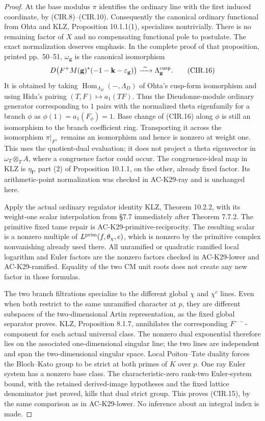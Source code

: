 \begin{proof}
At the base modulus \(\pi\) identifies the ordinary line
with the first induced coordinate, by (CIR.8)--(CIR.10).
Consequently the canonical ordinary functional from Ohta and
KLZ, Proposition 10.1.1(1), specializes nontrivially.  There is
no remaining factor of \(X\) and no compensating functional
pole to postulate.  The exact normalization deserves emphasis.
In the complete proof of that proposition, printed pp.~50--51,
\(\omega_{\mathbf g}\) is the canonical isomorphism
\[
 D\bigl(F^+M(\mathbf g)^*(-1-\mathbf k-\varepsilon_{\mathbf g})\bigr)
           \xrightarrow{\ \sim\ }\Lambda_{\mathbf g}^{\rm cusp}.
                                                               \tag{CIR.16}
\]
It is obtained by taking \(\operatorname{Hom}_{\Lambda_D}(-,\Lambda_D)\)
of Ohta's cusp-form isomorphism and using Hida's pairing
\((T,F)\mapsto a_1(TF)\).  Thus the Dieudonne-module ordinary
generator corresponding to \(1\) pairs with the normalized
theta eigenfamily for a branch \(\phi\) as
\(\phi(1)=a_1(F_\phi)=1\).
Base change of (CIR.16) along \(\phi\) is still an isomorphism
to the branch coefficient ring.  Transporting it across the
isomorphism \(\pi|_{F^+}\) remains an isomorphism and hence is
nonzero at weight one.  This uses the quotient-dual evaluation;
it does not project a theta eigenvector in
\(\omega_T\otimes_T A\), where a congruence factor could occur.
The congruence-ideal map in KLZ is \(\eta_{\mathbf f}\),
part (2) of Proposition 10.1.1, on the other, already fixed
factor.  Its arithmetic-point normalization was checked in
AC-K29-ray and is unchanged here.

Apply the actual ordinary regulator
identity KLZ, Theorem 10.2.2, with its weight-one scalar
interpolation from \S7.7 immediately after Theorem 7.7.2.
The primitive fixed tame repair is AC-K29-primitive-reciprocity.
The resulting scalar is a nonzero multiple of
\(L^{\rm prim}(f,\theta_\chi,e)\), which is nonzero by the
primitive complex nonvanishing already used there.  All
unramified or quadratic ramified local logarithm and Euler
factors are the nonzero factors checked in AC-K29-lower and
AC-K29-ramified.  Equality of the two CM unit roots does not
create any new factor in those formulas.

The two branch filtrations specialize to the different global
\(\chi\) and \(\chi^c\) lines.  Even when both restrict to the
same unramified character at \(p\), they are different
subspaces of the two-dimensional Artin representation, as
the fixed global separator proves.  KLZ, Proposition 8.1.7,
annihilates the corresponding \(F^{--}\)-component for each
actual universal class.  The nonzero dual exponential therefore
lies on the associated one-dimensional singular line; the two
lines are independent and span the two-dimensional singular
space.  Local Poitou--Tate duality forces the Bloch--Kato group
to be strict at both primes of \(K\) over \(p\).
One ray Euler system has a nonzero base class.  The
characteristic-zero rank-two Euler-system bound, with the
retained derived-image hypotheses and the fixed lattice
denominator just proved, kills that dual strict group.
This proves (CIR.15), by the same comparison as in
AC-K29-lower.  No inference about an integral index is made.
\end{proof}
